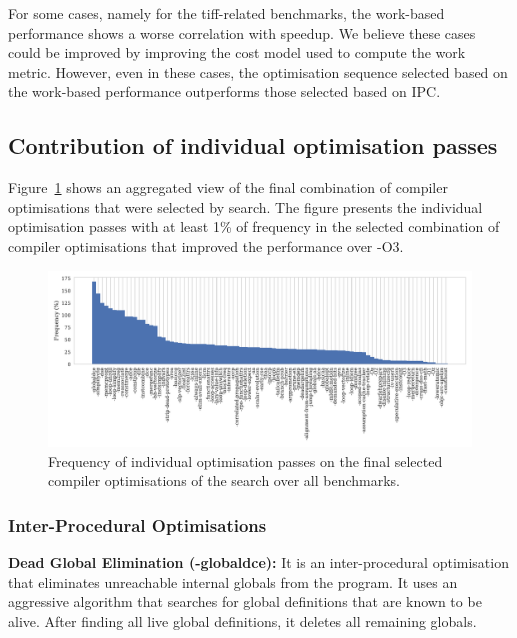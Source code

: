 For some cases, namely for the tiff-related benchmarks, the work-based performance shows a worse correlation with speedup.
We believe these cases could be improved by improving the cost model used to compute the work metric.
However, even in these cases, the optimisation sequence selected based on the work-based performance outperforms those selected based on IPC.

\subsection{Contribution of individual optimisation passes}

Figure~\ref{fig:flagsfreq} shows an aggregated view of the final combination of compiler optimisations that were selected by {\itercomp} search.
The figure presents the individual optimisation passes with at least 1\% of frequency in the selected combination of compiler optimisations that improved the performance over {\flagstype -O3}.

\begin{figure}[htb]
    \centering
    \includegraphics[width=\textwidth]{figs/flagsfreq.pdf}
    \caption{Frequency of individual optimisation passes on the final selected 
             compiler optimisations of the {\itercomp} search over
             all benchmarks.}
    \label{fig:flagsfreq}
\end{figure}

\subsubsection{Inter-Procedural Optimisations}
\noindent\textbf{Dead Global Elimination ({\flagstype -globaldce}):}
It is an inter-procedural optimisation that eliminates unreachable internal globals from the program.
It uses an aggressive algorithm that searches for global definitions that are known to be alive.
After finding all live global definitions, it deletes all remaining globals.

